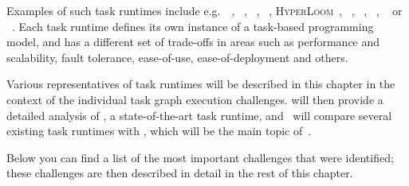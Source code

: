 Examples of such task runtimes include e.g.\ \dask~\cite{dask},
\parsl~\cite{parsl}, \ray~\cite{ray},
\pycompss~\cite{pycompss}, \textsc{HyperLoom}~\cite{hyperloom},
\gnuparallel~\cite{parallel}, \snakemake~\cite{snakemake},
\merlin~\cite{merlin},
\autosubmit~\cite{autosubmit} or \fireworks~\cite{fireworks}. Each task runtime
defines its own instance of a task-based programming model, and has a different set of trade-offs
in areas such as performance and scalability, fault tolerance, ease-of-use, ease-of-deployment and
others.

Various representatives of task runtimes will be described in this chapter in the context of the
individual task graph execution challenges.  will then provide a detailed
analysis of \dask{}, a state-of-the-art task runtime, and~
will compare several existing task runtimes with \hyperqueue{}, which will be the main
topic of~.

Below you can find a list of the most important challenges that were identified; these challenges
are then described in detail in the rest of this chapter.

